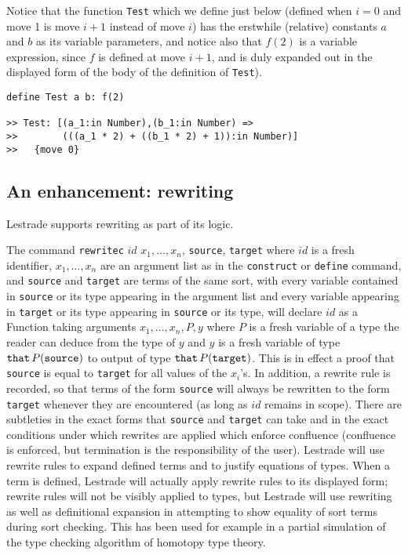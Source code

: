 \documentclass{article}
\begin{document}
 Notice that the function {\tt Test} which we define just below (defined when $i=0$ and move 1 is move $i+1$ instead of move $i$) has the erstwhile (relative) constants $a$ and $b$ as its variable parameters, and notice also that $f(2)$ is a variable expression, since $f$ is defined at move $i+1$, and is duly expanded out in the displayed form of the body of the definition of {\tt Test}).

\begin{verbatim}
define Test a b: f(2)

>> Test: [(a_1:in Number),(b_1:in Number) => 
>>        (((a_1 * 2) + ((b_1 * 2) + 1)):in Number)]
>>   {move 0}
\end{verbatim}

 

\subsection{An enhancement: rewriting}

Lestrade supports rewriting as part of its logic.

The command {\tt rewritec} $id$ $x_1, \ldots, x_n$, {\tt source}, {\tt target}  where $id$ is a fresh identifier, $x_1, \ldots, x_n$ are an argument list as in the {\tt construct} or {\tt define} command, and {\tt source} and {\tt target} are terms of the same sort, with every variable contained in {\tt source} or its type appearing in the argument list and every variable appearing in {\tt target} or its type appearing in {\tt source} or its type, will declare $id$ as a Function taking arguments $x_1,\ldots,x_n,P,y$ where $P$ is a fresh variable of a type the reader can deduce from the type of $y$ and $y$ is a fresh variable of type
${\tt that} \,P({\tt source})$ to output of type ${\tt that}\, P({\tt target})$.  This is in effect a proof that {\tt source} is equal to {\tt target} for all values of the $x_i$'s.  In addition, a rewrite rule is recorded, so that terms of the form {\tt source} will always be rewritten to the form {\tt target} whenever they are encountered (as long as $id$ remains in scope).  There are subtleties in the exact forms that {\tt source} and {\tt target} can take and in the exact conditions under which rewrites are applied which enforce confluence (confluence is enforced, but termination is the responsibility of the user).  Lestrade will use rewrite rules to expand defined terms and to justify equations of types.   When a term is defined, Lestrade will actually apply rewrite rules to its displayed form;  rewrite rules will not be visibly applied to types, but Lestrade will use rewriting as well as definitional expansion in attempting to show equality of sort terms during sort checking.   This has been used for example in a partial simulation of the type checking algorithm of homotopy type theory. 
\end{document}
